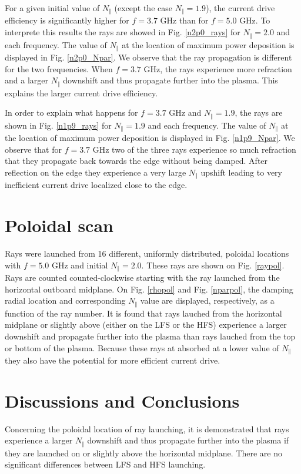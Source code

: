 \documentclass[a4paper,12pt]{article}%
\begin{document}
For a given initial value of $N_{\Vert}$ (except the case $N_{\Vert}=1.9$),
the current drive efficiency is significantly higher for $f=3.7$ GHz than for
$f=5.0$ GHz. To interprete this results the rays are showed in Fig.
\ref{n2p0_rays} for $N_{\Vert}=2.0$ and each frequency. The value of
$N_{\Vert}$ at the location of maximum power deposition is displayed in Fig.
\ref{n2p0_Npar}. We observe that the ray propagation is different for the two
frequencies. When $f=3.7$ GHz, the rays experience more refraction and a
larger $N_{\Vert}$ downshift and thus propagate further into the plasma. This
explains the larger current drive efficiency.

In order to explain what happens for $f=3.7$ GHz and $N_{\Vert}=1.9$, the rays
are shown in Fig. \ref{n1p9_rays} for $N_{\Vert}=1.9$ and each frequency. The
value of $N_{\Vert}$ at the location of maximum power deposition is displayed
in Fig. \ref{n1p9_Npar}. We observe that for $f=3.7$ GHz two of the three rays
experience so much refraction that they propagate back towards the edge
without being damped. After reflection on the edge they experience a very
large $N_{\Vert}$ upshift leading to very inefficient current drive localized
close to the edge.

\section{Poloidal scan}

Rays were launched from 16 different, uniformly distributed, poloidal
locations with $f=5.0$ GHz and initial $N_{\Vert}=2.0$. These rays are shown
on Fig. \ref{raypol}. Rays are counted counted-clockwise starting with the ray
launched from the horizontal outboard midplane. On Fig. \ref{rhopol} and Fig.
\ref{nparpol}, the damping radial location and corresponding $N_{\Vert}$ value
are displayed, respectively, as a function of the ray number. It is found that
rays lauched from the horizontal midplane or slightly above (either on the LFS
or the HFS) experience a larger downshift and propagate further into the
plasma than rays lauched from the top or bottom of the plasma. Because these
rays at absorbed at a lower value of $N_{\Vert}$ they also have the potential
for more efficient current drive.

\section{Discussions and Conclusions}

Concerning the poloidal location of ray launching, it is demonstrated that
rays experience a larger $N_{\Vert}$ downshift and thus propagate further into
the plasma if they are launched on or slightly above the horizontal midplane.
There are no significant differences between LFS and HFS launching.
\end{document}
